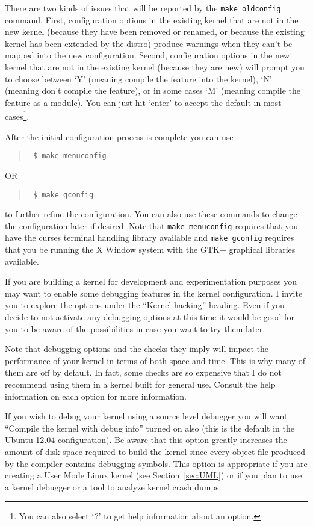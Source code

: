 \documentclass{article}
\newcommand{\command}[1]{\texttt{#1}}    %
\newenvironment{commands}
  {\begin{quote} \tt}
  {\end{quote}}
\begin{document}
There are two kinds of issues that will be reported by the \command{make oldconfig} command.
First, configuration options in the existing kernel that are not in the new kernel (because they
have been removed or renamed, or because the existing kernel has been extended by the distro)
produce warnings when they can't be mapped into the new configuration. Second, configuration
options in the new kernel that are not in the existing kernel (because they are new) will prompt
you to choose between `Y' (meaning compile the feature into the kernel), `N' (meaning don't
compile the feature), or in some cases `M' (meaning compile the feature as a module). You can
just hit `enter' to accept the default in most cases\footnote{You can also select `?' to get
  help information about an option.}.

After the initial configuration process is complete you can use
\begin{commands}
\$ make menuconfig
\end{commands}
OR
\begin{commands}
\$ make gconfig
\end{commands}

to further refine the configuration. You can also use these commands to change the configuration
later if desired. Note that \command{make menuconfig} requires that you have the curses terminal
handling library available and \command{make gconfig} requires that you be running the X Window
system with the GTK+ graphical libraries available.

If you are building a kernel for development and experimentation purposes you may want to enable
some debugging features in the kernel configuration. I invite you to explore the options under
the ``Kernel hacking'' heading. Even if you decide to not activate any debugging options at this
time it would be good for you to be aware of the possibilities in case you want to try them
later.

Note that debugging options and the checks they imply will impact the performance of your kernel
in terms of both space and time. This is why many of them are off by default. In fact, some
checks are so expensive that I do not recommend using them in a kernel built for general use.
Consult the help information on each option for more information.

If you wish to debug your kernel using a source level debugger you will want ``Compile the
kernel with debug info'' turned on also (this is the default in the Ubuntu 12.04 configuration).
Be aware that this option greatly increases the amount of disk space required to build the
kernel since every object file produced by the compiler contains debugging symbols. This option
is appropriate if you are creating a User Mode Linux kernel (see Section~\ref{sec:UML}) or if
you plan to use a kernel debugger or a tool to analyze kernel crash dumps.
\end{document}
